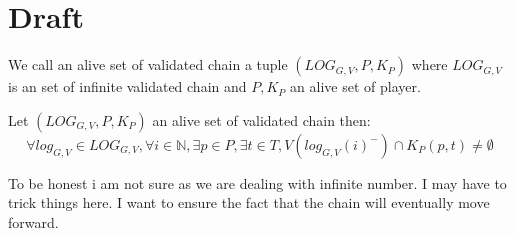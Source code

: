 \section{Draft}

\begin{mydef}
	We call an alive set of validated chain a tuple $(LOG_{G,V},P,K_P)$ where $LOG_{G,V}$ is an set of infinite validated chain and $P,K_P$ an alive set of player.
\end{mydef}

\begin{myprop*}
	Let $(LOG_{G,V},P,K_P)$ an alive set of validated chain then:
	$$\forall log_{G,V} \in LOG_{G,V}, \forall i \in \mathbb{N}, \exists p \in P, \exists t \in T , V(log_{G,V}(i)^-) \cap K_P(p,t) \neq \emptyset $$
\end{myprop*}
\begin{myrem}
	To be honest i am not sure as we are dealing with infinite number. I may have to trick things here. I want to ensure the fact that the chain will eventually move forward.
\end{myrem}
